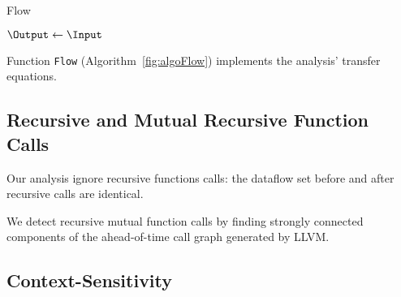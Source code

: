 \IncMargin{1em}
\begin{algorithm*}
\caption{Flow}\label{fig:algoFlow}
\SetAlgoLined
\LinesNumbered
\DontPrintSemicolon
{}


$\Output \leftarrow \Input$\;
\end{algorithm*}
\DecMargin{1em}

Function \texttt{Flow} (Algorithm~\ref{fig:algoFlow})
implements the analysis' transfer equations.

\subsection{Recursive and Mutual Recursive Function Calls} 

Our analysis ignore recursive functions calls: the dataflow set
before and after recursive calls are identical. 

We detect recursive mutual function calls by finding strongly
connected components of the ahead-of-time call graph generated
by LLVM. 

\subsection{Context-Sensitivity} 

